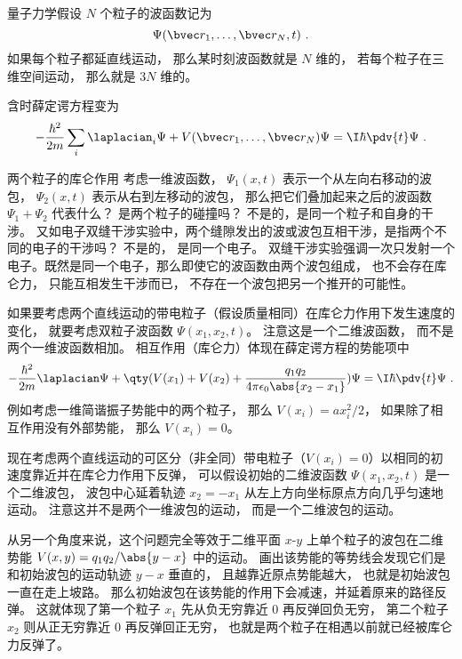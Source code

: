 
\begin{issues}
\issueDraft
\end{issues}


量子力学假设 $N$ 个粒子的波函数记为
\begin{equation}
\Psi(\bvec r_1, \dots, \bvec r_N, t)~.
\end{equation}
如果每个粒子都延直线运动， 那么某时刻波函数就是 $N$ 维的， 若每个粒子在三维空间运动， 那么就是 $3N$ 维的。

含时薛定谔方程变为
\begin{equation}
-\frac{\hbar^2}{2m} \sum_i\laplacian_i \Psi + V(\bvec r_1, \dots, \bvec r_N) \Psi = \I \hbar \pdv{t}\Psi~.
\end{equation}


\begin{example}{两个粒子的库仑作用}
考虑一维波函数， $\Psi_1(x,t)$ 表示一个从左向右移动的波包， $\Psi_2(x,t)$ 表示从右到左移动的波包， 那么把它们叠加起来之后的波函数 $\Psi_1 + \Psi_2$ 代表什么？ 是两个粒子的碰撞吗？ 不是的，是同一个粒子和自身的干涉。 又如电子双缝干涉实验中，两个缝隙发出的波或波包互相干涉，是指两个不同的电子的干涉吗？ 不是的， 是同一个电子。 双缝干涉实验强调一次只发射一个电子。既然是同一个电子，那么即使它的波函数由两个波包组成， 也不会存在库仑力， 只能互相发生干涉而已， 不存在一个波包把另一个推开的可能性。

如果要考虑两个直线运动的带电粒子（假设质量相同）在库仑力作用下发生速度的变化， 就要考虑双粒子波函数 $\Psi(x_1, x_2, t)$。 注意这是一个二维波函数， 而不是两个一维波函数相加。 相互作用（库仑力）体现在薛定谔方程的势能项中
\begin{equation}
-\frac{\hbar^2}{2m}\laplacian \Psi + \qty(V(x_1) + V(x_2) + \frac{q_1 q_2}{4\pi\epsilon_0\abs{x_2 - x_1}}) \Psi = \I\hbar \pdv{t}\Psi~.
\end{equation}
例如考虑一维简谐振子势能中的两个粒子， 那么 $V(x_i) = ax_i^2/2$， 如果除了相互作用没有外部势能， 那么 $V(x_i) = 0$。

现在考虑两个直线运动的可区分（非全同）带电粒子（$V(x_i) = 0$）以相同的初速度靠近并在库仑力作用下反弹， 可以假设初始的二维波函数 $\Psi(x_1, x_2, t)$ 是一个二维波包， 波包中心延着轨迹 $x_2 = -x_1$ 从左上方向坐标原点方向几乎匀速地运动。 注意这并不是两个一维波包的运动， 而是一个二维波包的运动。

从另一个角度来说，这个问题完全等效于二维平面 $x$-$y$ 上单个粒子的波包在二维势能 $V(x,y) = q_1q_2/\abs{y-x}$ 中的运动。 画出该势能的等势线会发现它们是和初始波包的运动轨迹 $y-x$ 垂直的， 且越靠近原点势能越大， 也就是初始波包一直在走上坡路。 那么初始波包在该势能的作用下会减速，并延着原来的路径反弹。 这就体现了第一个粒子 $x_1$ 先从负无穷靠近 $0$ 再反弹回负无穷， 第二个粒子 $x_2$ 则从正无穷靠近 $0$ 再反弹回正无穷， 也就是两个粒子在相遇以前就已经被库仑力反弹了。
\end{example}
